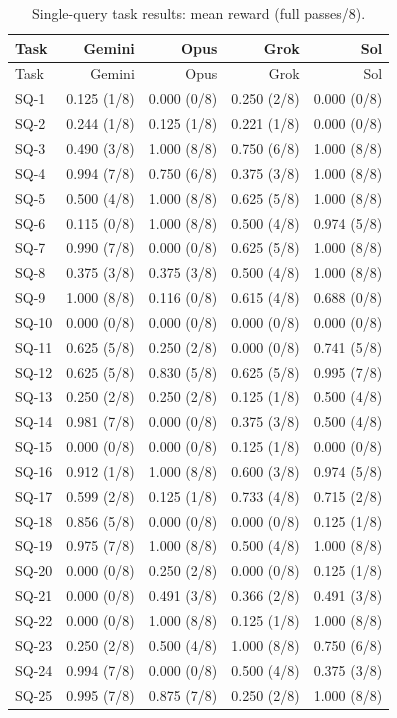 \documentclass[11pt,letterpaper]{article}
\begin{document}
\begin{longtable}{@{}lrrrr@{}}
\caption{Single-query task results: mean reward (full passes/8).}\\
\toprule Task & Gemini & Opus & Grok & Sol\\\midrule\endfirsthead
\toprule Task & Gemini & Opus & Grok & Sol\\\midrule\endhead
SQ-1 & 0.125 (1/8) & 0.000 (0/8) & 0.250 (2/8) & 0.000 (0/8)\\
SQ-2 & 0.244 (1/8) & 0.125 (1/8) & 0.221 (1/8) & 0.000 (0/8)\\
SQ-3 & 0.490 (3/8) & 1.000 (8/8) & 0.750 (6/8) & 1.000 (8/8)\\
SQ-4 & 0.994 (7/8) & 0.750 (6/8) & 0.375 (3/8) & 1.000 (8/8)\\
SQ-5 & 0.500 (4/8) & 1.000 (8/8) & 0.625 (5/8) & 1.000 (8/8)\\
SQ-6 & 0.115 (0/8) & 1.000 (8/8) & 0.500 (4/8) & 0.974 (5/8)\\
SQ-7 & 0.990 (7/8) & 0.000 (0/8) & 0.625 (5/8) & 1.000 (8/8)\\
SQ-8 & 0.375 (3/8) & 0.375 (3/8) & 0.500 (4/8) & 1.000 (8/8)\\
SQ-9 & 1.000 (8/8) & 0.116 (0/8) & 0.615 (4/8) & 0.688 (0/8)\\
SQ-10 & 0.000 (0/8) & 0.000 (0/8) & 0.000 (0/8) & 0.000 (0/8)\\
SQ-11 & 0.625 (5/8) & 0.250 (2/8) & 0.000 (0/8) & 0.741 (5/8)\\
SQ-12 & 0.625 (5/8) & 0.830 (5/8) & 0.625 (5/8) & 0.995 (7/8)\\
SQ-13 & 0.250 (2/8) & 0.250 (2/8) & 0.125 (1/8) & 0.500 (4/8)\\
SQ-14 & 0.981 (7/8) & 0.000 (0/8) & 0.375 (3/8) & 0.500 (4/8)\\
SQ-15 & 0.000 (0/8) & 0.000 (0/8) & 0.125 (1/8) & 0.000 (0/8)\\
SQ-16 & 0.912 (1/8) & 1.000 (8/8) & 0.600 (3/8) & 0.974 (5/8)\\
SQ-17 & 0.599 (2/8) & 0.125 (1/8) & 0.733 (4/8) & 0.715 (2/8)\\
SQ-18 & 0.856 (5/8) & 0.000 (0/8) & 0.000 (0/8) & 0.125 (1/8)\\
SQ-19 & 0.975 (7/8) & 1.000 (8/8) & 0.500 (4/8) & 1.000 (8/8)\\
SQ-20 & 0.000 (0/8) & 0.250 (2/8) & 0.000 (0/8) & 0.125 (1/8)\\
SQ-21 & 0.000 (0/8) & 0.491 (3/8) & 0.366 (2/8) & 0.491 (3/8)\\
SQ-22 & 0.000 (0/8) & 1.000 (8/8) & 0.125 (1/8) & 1.000 (8/8)\\
SQ-23 & 0.250 (2/8) & 0.500 (4/8) & 1.000 (8/8) & 0.750 (6/8)\\
SQ-24 & 0.994 (7/8) & 0.000 (0/8) & 0.500 (4/8) & 0.375 (3/8)\\
SQ-25 & 0.995 (7/8) & 0.875 (7/8) & 0.250 (2/8) & 1.000 (8/8)\\
\bottomrule\end{longtable}
\end{document}
